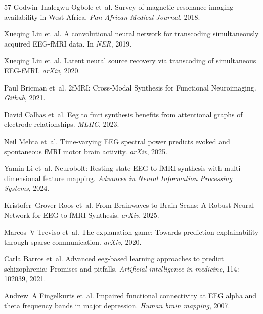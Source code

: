 \documentclass{article}
\begin{document}
\begin{thebibliography}{57}
Godwin~Inalegwu Ogbole et~al.
\newblock Survey of magnetic resonance imaging availability in {W}est {A}frica.
\newblock \emph{Pan African Medical Journal}, 2018.

Xueqing Liu et~al.
\newblock A convolutional neural network for transcoding simultaneously acquired {EEG}-f{MRI} data.
\newblock In \emph{NER}, 2019.

Xueqing Liu et~al.
\newblock Latent neural source recovery via transcoding of simultaneous {EEG}-f{MRI}.
\newblock \emph{arXiv}, 2020.

Paul Bricman et~al.
2f{MRI}: {C}ross-{M}odal {S}ynthesis for {F}unctional {N}euroimaging.
\newblock \emph{Github}, 2021.

David Calhas et~al.
\newblock Eeg to fmri synthesis benefits from attentional graphs of electrode relationships.
\newblock \emph{MLHC}, 2023.

Neil Mehta et~al.
\newblock Time-varying {EEG} spectral power predicts evoked and spontaneous f{MRI} motor brain activity.
\newblock \emph{arXiv}, 2025.

Yamin Li et~al.
\newblock Neurobolt: Resting-state {EEG}-to-f{MRI} synthesis with multi-dimensional feature mapping.
\newblock \emph{Advances in Neural Information Processing Systems}, 2024.

Kristofer~Grover Roos et~al.
\newblock From {B}rainwaves to {B}rain {S}cans: {A} {R}obust {N}eural {N}etwork for {EEG}-to-f{MRI} {S}ynthesis.
\newblock \emph{arXiv}, 2025.

Marcos~V Treviso et~al.
\newblock The explanation game: {T}owards prediction explainability through sparse communication.
\newblock \emph{arXiv}, 2020.

Carla Barros et~al.
\newblock Advanced eeg-based learning approaches to predict schizophrenia: Promises and pitfalls.
\newblock \emph{Artificial intelligence in medicine}, 114: 102039, 2021.

Andrew~A Fingelkurts et~al.
\newblock Impaired functional connectivity at {EEG} alpha and theta frequency bands in major depression.
\newblock \emph{Human brain mapping}, 2007.


\end{thebibliography}
\end{document}

